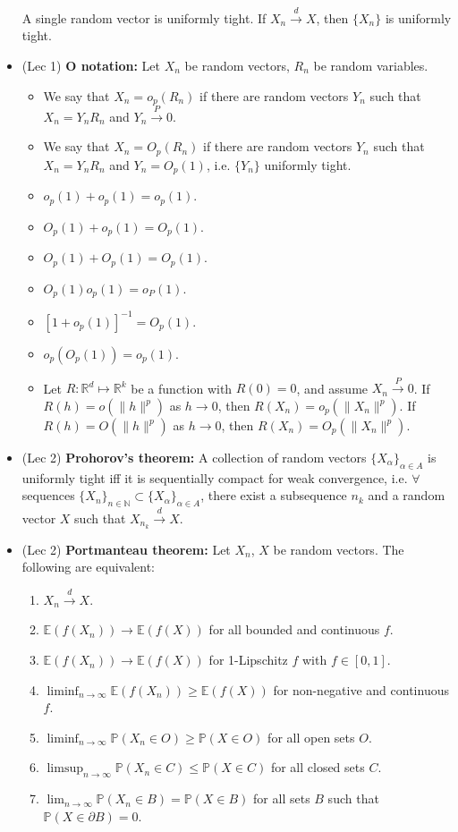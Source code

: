 \documentclass[twoside]{article}
\newcommand{\dis}{\displaystyle}
\newcommand\bbE{\mathbb{E}}
\newcommand\bbN{\mathbb{N}}
\newcommand\bbP{\mathbb{P}}
\newcommand\bbR{\mathbb{R}}
\newcommand\cd{\stackrel{d}{\goesto}}
\newcommand\cp{\stackrel{P}{\goesto}}
\newcommand\goesto{\rightarrow}
\begin{document}
\begin{itemize}
A single random vector is uniformly tight. If $X_n \cd X$, then $\{X_n\}$ is uniformly tight.


\item (Lec 1) \textbf{O notation:} Let $X_n$ be random vectors, $R_n$ be random variables.
\begin{itemize}
\item We say that $X_n=o_p(R_n)$ if there are random vectors $Y_n$ such that $X_n = Y_n R_n$ and $Y_n \cp 0$.

\item We say that $X_n=O_p(R_n)$ if there are random vectors $Y_n$ such that $X_n = Y_n R_n$ and $Y_n = O_p(1)$, i.e. $\{Y_n\}$ uniformly tight.

\item $o_p(1)+o_p(1)=o_p(1)$.
\item $O_p(1)+o_p(1)=O_p(1)$.
\item $O_p(1)+O_p(1)=O_p(1)$.
\item $O_p(1)o_p(1) = o_P(1)$.
\item $[1 + o_p(1)]^{-1} = O_p(1)$.
\item $o_p(O_p(1)) = o_p(1)$.
\item Let $R: \bbR^d \mapsto \bbR^k$ be a function with $R(0)=0$, and assume $X_n \cp 0$. If $R(h) = o(\|h\|^p)$ as $h \goesto 0$, then $R(X_n) = o_p(\|X_n\|^p)$. If $R(h) = O(\|h\|^p)$ as $h \goesto 0$, then $R(X_n) = O_p(\|X_n\|^p)$.
\end{itemize}

\item (Lec 2) \textbf{Prohorov's theorem:} A collection of random vectors $\{X_{\alpha}\}_{\alpha \in A}$ is uniformly tight iff it is sequentially compact for weak convergence, i.e. $\forall $ sequences $\{X_{n} \}_{n \in \bbN} \subset \{X_{\alpha}\}_{\alpha \in A}$, there exist a subsequence $n_k$ and a random vector $X$ such that $X_{n_k} \cd X$.

\item (Lec 2) \textbf{Portmanteau theorem:} Let $X_n$, $X$ be random vectors. The following are equivalent:
\begin{enumerate}
\item $X_n \cd X$.
\item $\bbE(f(X_n)) \goesto \bbE(f(X))$ for all bounded and continuous $f$.
\item $\bbE(f(X_n)) \goesto \bbE(f(X))$ for 1-Lipschitz $f$ with $f \in [0,1]$.
\item $\dis\liminf_{n \goesto \infty} \bbE(f(X_n)) \geq \bbE(f(X))$ for non-negative and continuous $f$.
\item $\dis\liminf_{n \goesto \infty}\bbP(X_n\in O) \geq \bbP(X \in O) $ for all open sets $O$.
\item $\dis\limsup_{n \rightarrow \infty}\bbP(X_n\in C) \leq \bbP(X \in C) $ for all closed sets $C$.
\item $\dis\lim_{n \goesto \infty}\bbP(X_n \in B) = \bbP(X \in B) $ for all sets $B$ such that $\bbP(X \in \partial B) = 0$.
\end{enumerate}

\end{itemize}
\end{document}

